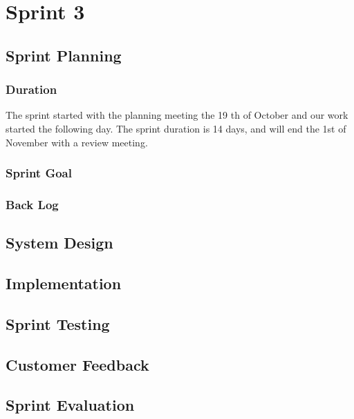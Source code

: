 \chapter{Sprint 3}


\section{Sprint Planning}

\subsection{Duration}

The sprint started with the planning meeting the 19 th of October and our work started the following day. The sprint duration is 14 days, and will end the 1st of November with a review meeting. 


\subsection{Sprint Goal}

\subsection{Back Log}


\section{System Design}


\section{Implementation}


\section{Sprint Testing}


\section{Customer Feedback}


\section{Sprint Evaluation}


